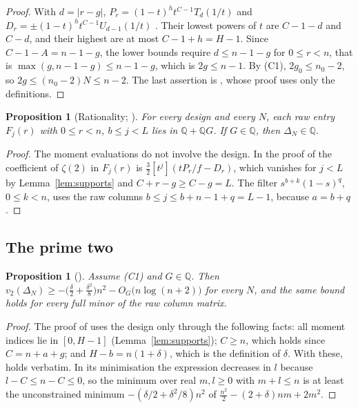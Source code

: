 \documentclass[11pt]{article}
\newtheorem{proposition}[theorem]{Proposition}
\theoremstyle{definition}
\begin{document}
\begin{proof}
With $d=|r-g|$, $P_r=(1-t)^ht^{C-1}T_d(1/t)$ and $D_r=\pm(1-t)^ht^{C-1}U_{d-1}(1/t)$ \cite[Sec.~2]{OAI}. Their lowest powers of $t$ are $C-1-d$ and $C-d$, and their highest are at most $C-1+h=H-1$. Since $C-1-A=n-1-g$, the lower bounds require $d\le n-1-g$ for $0\le r<n$, that is $\max(g,n-1-g)\le n-1-g$, which is $2g\le n-1$. By (C1), $2g_0\le n_0-2$, so $2g\le(n_0-2)N\le n-2$. The last assertion is \cite[Eq.~(5)]{OAI}, whose proof uses only the definitions.
\end{proof}

\begin{proposition}[Rationality; {\cite[Prop.~2.1]{OAI}}]\label{prop:rational}
For every design and every $N$, each raw entry $F_j(r)$ with $0\le r<n$, $b\le j<L$ lies in $\mathbb Q+\mathbb QG$. If $G\in\mathbb Q$, then $\Delta_N\in\mathbb Q$.
\end{proposition}

\begin{proof}
The moment evaluations \cite[Eqs.~(9)--(19)]{OAI} do not involve the design. In the proof of \cite[Prop.~2.1]{OAI} the coefficient of $\zeta(2)$ in $F_j(r)$ is $\tfrac32[t^j](tP_r/f-D_r)$, which vanishes for $j<L$ by Lemma~\ref{lem:supports} and $C+r-g\ge C-g=L$. The filter $s^{b+k}(1-s)^q$, $0\le k<n$, uses the raw columns $b\le j\le b+n-1+q=L-1$, because $a=b+q$.
\end{proof}

\subsection{The prime two}\label{sec:two}

\begin{proposition}[{\cite[Prop.~2.2]{OAI}}]\label{prop:two}
Assume (C1) and $G\in\mathbb Q$. Then $v_2(\Delta_N)\ge-\big(\frac\delta2+\frac{\delta^2}8\big)n^2-O_G\big(n\log(n+2)\big)$ for every $N$, and the same bound holds for every full minor of the raw column matrix.
\end{proposition}

\begin{proof}
The proof of \cite[Prop.~2.2]{OAI} uses the design only through the following facts: all moment indices lie in $[0,H-1]$ (Lemma~\ref{lem:supports}); $C\ge n$, which holds since $C=n+a+g$; and $H-b=n(1+\delta)$, which is the definition of $\delta$. With these, \cite[Eq.~(30)]{OAI} holds verbatim. In its minimisation the expression decreases in $l$ because $l-C\le n-C\le0$, so the minimum over real $m,l\ge0$ with $m+l\le n$ is at least the unconstrained minimum $-(\delta/2+\delta^2/8)n^2$ of $\tfrac{n^2}{2}-(2+\delta)nm+2m^2$.
\end{proof}
\end{document}
